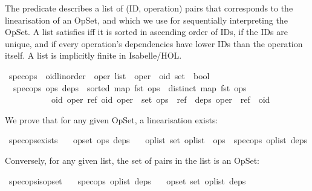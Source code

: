 The  predicate describes a list of (ID, operation) pairs that corresponds to the linearisation of an OpSet, and which we use for sequentially interpreting the OpSet.
A list satisfies  iff it is sorted in ascending order of IDs, if the IDs are unique, and if every operation's dependencies have lower IDs than the operation itself.
A list is implicitly finite in Isabelle/HOL.

\begin{isabelle}
\isamarkupfalse%
\ spec{\isacharunderscore}ops\ {\isacharcolon}{\isacharcolon}\ {\isachardoublequoteopen}{\isacharparenleft}{\isacharprime}oid{\isacharcolon}{\isacharcolon}{\isacharbraceleft}linorder{\isacharbraceright}\ {\isasymtimes}\ {\isacharprime}oper{\isacharparenright}\ list\ {\isasymRightarrow}\ {\isacharparenleft}{\isacharprime}oper\ {\isasymRightarrow}\ {\isacharprime}oid\ set{\isacharparenright}\ {\isasymRightarrow}\ bool{\isachardoublequoteclose}\isanewline
{}\isanewline
\ \ {\isachardoublequoteopen}spec{\isacharunderscore}ops\ ops\ deps\ {\isasymequiv}\ {\isacharparenleft}sorted\ {\isacharparenleft}map\ fst\ ops{\isacharparenright}\ {\isasymand}\ distinct\ {\isacharparenleft}map\ fst\ ops{\isacharparenright}\ {\isasymand}\isanewline
\ \ \ \ \ \ \ \ \ \ \ {\isacharparenleft}{\isasymforall}oid\ oper\ ref{\isachardot}\ {\isacharparenleft}oid{\isacharcomma}\ oper{\isacharparenright}\ {\isasymin}\ set\ ops\ {\isasymand}\ ref\ {\isasymin}\ deps\ oper\ {\isasymlongrightarrow}\ ref\ {\isacharless}\ oid{\isacharparenright}{\isacharparenright}{\isachardoublequoteclose}
\end{isabelle}
\noindent We prove that for any given OpSet, a  linearisation exists:
\begin{isabelle}
\isamarkupfalse%
\ spec{\isacharunderscore}ops{\isacharunderscore}exists{\isacharcolon}\isanewline
\ \ \ {\isachardoublequoteopen}opset\ ops\ deps{\isachardoublequoteclose}\isanewline
\ \ \ {\isachardoublequoteopen}{\isasymexists}op{\isacharunderscore}list{\isachardot}\ set\ op{\isacharunderscore}list\ {\isacharequal}\ ops\ {\isasymand}\ spec{\isacharunderscore}ops\ op{\isacharunderscore}list\ deps{\isachardoublequoteclose}
\end{isabelle}
\noindent Conversely, for any given  list, the set of pairs in the list is an OpSet:
\begin{isabelle}
\isamarkupfalse%
\ spec{\isacharunderscore}ops{\isacharunderscore}is{\isacharunderscore}opset{\isacharcolon}\isanewline
\ \ \ {\isachardoublequoteopen}spec{\isacharunderscore}ops\ op{\isacharunderscore}list\ deps{\isachardoublequoteclose}\isanewline
\ \ \ {\isachardoublequoteopen}opset\ {\isacharparenleft}set\ op{\isacharunderscore}list{\isacharparenright}\ deps{\isachardoublequoteclose}
\end{isabelle}

